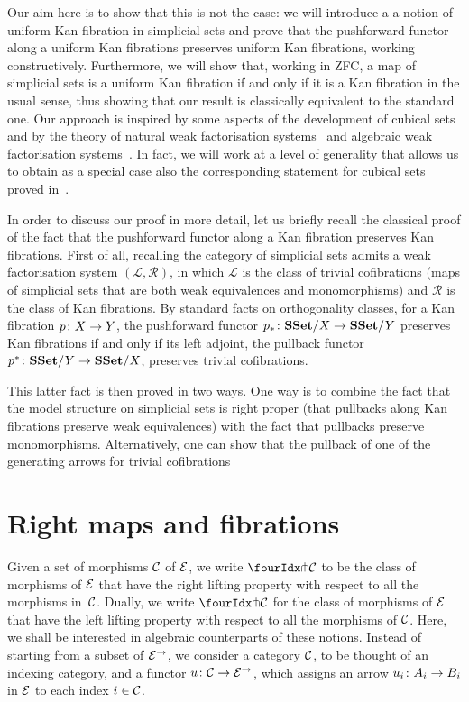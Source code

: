 \documentclass[reqno,10pt,a4paper,oneside]{amsart}
\begin{document}
Our aim here is to show that this is not the case: we will introduce a a notion of uniform Kan fibration in simplicial sets and prove that the pushforward functor along a uniform Kan fibrations preserves uniform Kan fibrations, working constructively. Furthermore, we will show that, working in ZFC, a map of simplicial sets is a uniform Kan fibration if and only if it is a Kan fibration in the usual sense, thus showing that our result is classically equivalent to the standard one. Our approach is inspired by some aspects of the development of cubical sets and by the theory of natural weak factorisation systems~\cite{grandis-tholen-nwfs} and algebraic weak factorisation systems~\cite{garner:small-object-argument}. In fact, we will work at a level of generality that allows us to obtain as a special case also the corresponding statement for cubical sets proved in~\cite{coquand-cubical-sets}. \medskip


In order to discuss our proof in more detail, let us briefly recall the classical proof of the fact that the pushforward functor along a Kan fibration preserves Kan fibrations. First of all, recalling the category of simplicial sets admits
a weak factorisation system $(\mathcal{L}, \mathcal{R})$, in which $\mathcal{L}$ is the class of trivial cofibrations
 (\ie maps of simplicial sets that are both weak equivalences and monomorphisms) and $\mathcal{R}$ is the class
 of Kan fibrations. By standard facts on orthogonality classes, for a Kan fibration $p \co X \to Y$, the 
 pushforward functor $p_* \co \SSet/X \to \SSet/Y$ preserves Kan fibrations if and only if its left adjoint,
 the pullback functor $p^* \co \SSet/Y \to \SSet/X$,  preserves trivial cofibrations.
 
This latter fact is then proved in two ways. One way is to combine the fact that the model structure on simplicial sets is right proper (\ie that pullbacks along Kan fibrations preserve weak equivalences) with the fact that pullbacks preserve monomorphisms.
Alternatively, one can show that the pullback of one of the generating arrows for trivial cofibrations




\newpage


\section{Right maps and fibrations}
\label{sec-orthog-functors}


 Given a set of morphisms $\cal{C}$ of $\catE$, we 
write $\liftr{\cal{C}}$ to be the class of morphisms of $\catE$ that have 
the right lifting property with respect to all the morphisms in~$\cal{C}$. Dually, we write $\liftl{\cal{C}}$ for the class of morphisms of $\catE$ that have the left lifting property with respect to all the morphisms of $\cal{C}$. 
Here, we shall be interested in algebraic counterparts of these notions. Instead of starting from a subset of $\catE^\to$, we consider a category $\cal{C}$, to be thought of an indexing category, and a functor $u \co \cal{C} \to \catE^\to$, which assigns an arrow $u_i \co A_i \to B_i$ in $\catE$ to each index $i \in \cal{C}$.
\end{document}
